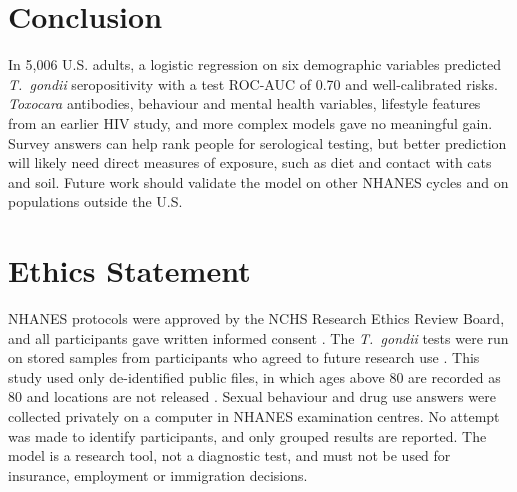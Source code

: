 \documentclass[conference]{IEEEtran}
\begin{document}
\section{Conclusion}
In 5,006 U.S. adults, a logistic regression on six demographic variables predicted \textit{T.~gondii} seropositivity with a test ROC-AUC of 0.70 and well-calibrated risks. \textit{Toxocara} antibodies, behaviour and mental health variables, lifestyle features from an earlier HIV study, and more complex models gave no meaningful gain. Survey answers can help rank people for serological testing, but better prediction will likely need direct measures of exposure, such as diet and contact with cats and soil. Future work should validate the model on other NHANES cycles and on populations outside the U.S.

\section*{Ethics Statement}
NHANES protocols were approved by the NCHS Research Ethics Review Board, and all participants gave written informed consent \cite{cdc_erb}. The \textit{T.~gondii} tests were run on stored samples from participants who agreed to future research use \cite{cdc_sstoxo}. This study used only de-identified public files, in which ages above 80 are recorded as 80 and locations are not released \cite{cdc_demo}. Sexual behaviour and drug use answers were collected privately on a computer in NHANES examination centres. No attempt was made to identify participants, and only grouped results are reported. The model is a research tool, not a diagnostic test, and must not be used for insurance, employment or immigration decisions.
\end{document}
